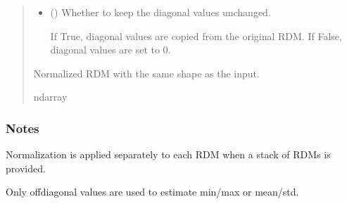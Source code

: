 \documentclass[letterpaper,10pt,english]{sphinxhowto}
\begin{document}
\begin{fulllineitems}
\begin{quote}
\begin{description}
\begin{itemize}
\begin{itemize}
\end{itemize}


\item {} 
\sphinxAtStartPar
{} (\sphinxstyleliteralemphasis{\sphinxupquote{, }}) \textendash{} 
\sphinxAtStartPar
Whether to keep the diagonal values unchanged.

\sphinxAtStartPar
If True, diagonal values are copied from the original RDM.
If False, diagonal values are set to 0.


\end{itemize}

\sphinxAtStartPar
{} \textendash{} Normalized RDM with the same shape as the input.

\sphinxAtStartPar
ndarray

\end{description}\end{quote}
\subsubsection*{Notes}

\sphinxAtStartPar
Normalization is applied separately to each RDM when a stack of RDMs is provided.

\sphinxAtStartPar
Only off\sphinxhyphen{}diagonal values are used to estimate min/max or mean/std.

\end{fulllineitems}

\end{document}

